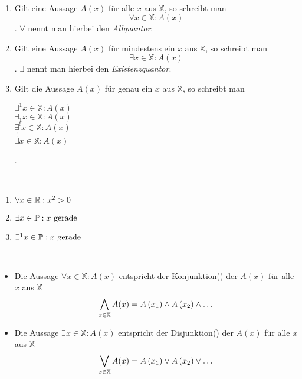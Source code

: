 \begin{definition}~
\begin{enumerate}
\item Gilt eine Aussage $A(x)$ für alle $x$ aus $\mathbb{X}$, so schreibt man \[\forall x \in \mathbb{X} : A(x)\] . $\forall$ nennt man hierbei den \emph{Allquantor}.
\item Gilt eine Aussage $A(x)$ für mindestens ein $x$ aus $\mathbb{X}$, so schreibt man \[\exists x \in \mathbb{X} : A(x)\] . $\exists$ nennt man hierbei den \emph{Existenzquantor}.
\item Gilt die Aussage $A(x)$ für genau ein $x$ aus $\mathbb{X}$, so schreibt man
	\begin{multicols}{2}
	$\exists^1 x \in \mathbb{X} : A(x)$\\
	$\exists_1 x \in \mathbb{X} : A(x)$\\
	$\exists^! x \in \mathbb{X} : A(x)$\\
	$\stackrel{!}{\exists} x \in \mathbb{X} : A(x)$
	\end{multicols}
	.
\end{enumerate}
\end{definition}

\begin{example}~
\begin{enumerate}
\item $\forall x \in \mathbb{R} : x^2 > 0$
\item $\exists x \in \mathbb{P} : x \text{ gerade}$
\item $\exists^1 x \in \mathbb{P} : x \text{ gerade}$
\end{enumerate}
\end{example}

\begin{note}~
\begin{itemize}
\item Die Aussage $\forall x \in \mathbb{X} : A(x)$ entspricht der Konjunktion() der $A(x)$ für alle $x$ aus $\mathbb{X}$ \[\bigwedge_{x \in \mathbb{X}} A(x) = A\left(x_1\right) \wedge A\left(x_2\right) \wedge \dots\]
\item Die Aussage $\exists x \in \mathbb{X} : A(x)$ entspricht der Disjunktion() der $A(x)$ für alle $x$ aus $\mathbb{X}$ \[\bigvee_{x \in \mathbb{X}} A(x) = A\left(x_1\right) \vee A\left(x_2\right) \vee \dots\]
\end{itemize}
\end{note}

